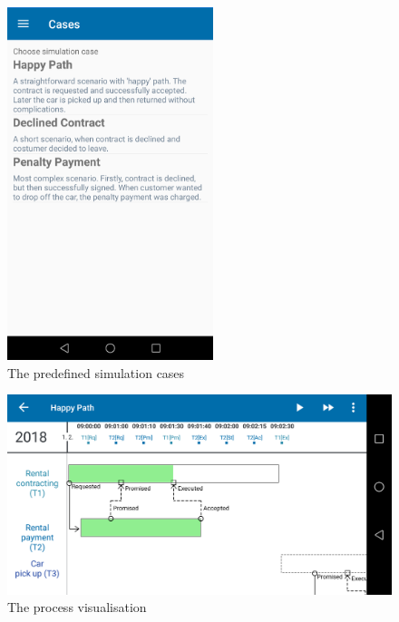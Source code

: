 \begin{figure}[ht!]
\centering
\includegraphics[width=6cm,keepaspectratio]{img/app-process-list}
\caption{The predefined simulation cases}
\label{fig:app-list}
\end{figure}

\begin{figure}[ht!]
\centering
\includegraphics[width=12cm,keepaspectratio]{img/app-process-progress}
\caption{The process visualisation}
\label{fig:app-process-progress}
\end{figure}


